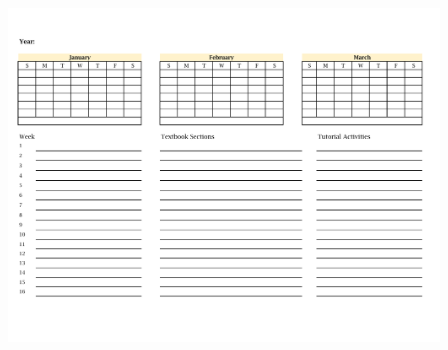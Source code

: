 \begin{mybox}[width=\textwidth]

\includegraphics[width=4.5in,height=7in]{Calendar3.pdf}

\end{mybox}

\mypage

